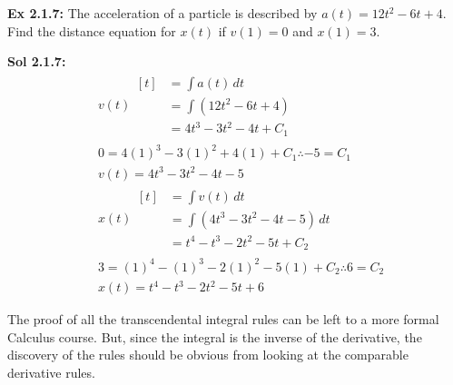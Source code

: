\begin{tcolorbox}[example]
    \textbf{Ex 2.1.7: } The acceleration of a particle is described by $a(t) = 12t^2 - 6t + 4$. Find the distance equation for $x(t)$ if $v(1) = 0$ and $x(1) = 3$.
\end{tcolorbox}
\begin{tcolorbox}[solution]
    \textbf{Sol 2.1.7: } \begin{align*}
        & v(t) \begin{aligned}[t]
            & = \int a(t) \, dt \\[11pt]
            & = \int \left(12t^2 - 6t + 4\right) \\[11pt]
            & = 4t^3 - 3t^2 - 4t + C_1 
        \end{aligned} \\[11pt]
        & 0 = 4(1)^3 - 3(1)^2 + 4(1) + C_1 \therefore -5 = C_1 \\[11pt]
        & v(t) = 4t^3 - 3t^2 - 4t - 5 \\[11pt]
        & x(t) \begin{aligned}[t]
            & = \int v(t) \, dt \\[11pt]
            & = \int \left(4t^3 - 3t^2 - 4t - 5\right) \, dt \\[11pt]
            & = t^4 - t^3 - 2t^2 - 5t + C_2
        \end{aligned} \\[11pt]
        & 3 = (1)^4 - (1)^3 - 2(1)^2 - 5(1) + C_2 \therefore 6 = C_2 \\[11pt]
        & \boxed{x(t) = t^4 - t^3 - 2t^2 - 5t + 6}
    \end{align*}
\end{tcolorbox}

The proof of all the transcendental integral rules can be left to a more formal Calculus course. But, since the integral is the inverse of the derivative, the discovery of the rules should be obvious from looking at the comparable derivative rules. \par

